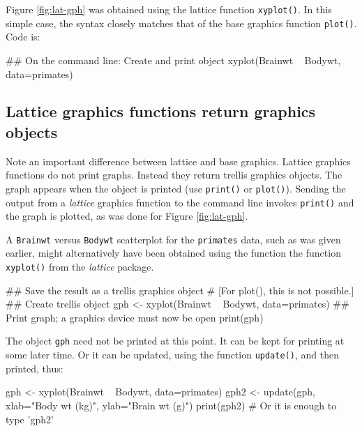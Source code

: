 \documentclass{tufte-book}\usepackage[]{graphicx}\usepackage[]{color}
\newcommand{\txtt}[1]{\texttt{#1}}
\begin{document}
Figure \ref{fig:lat-gph} was obtained using the lattice function
\txtt{xyplot()}. In this simple case, the syntax closely matches
that of the base graphics function \txtt{plot()}. Code is:

\begin{Schunk}
\begin{Sinput}
## On the command line: Create and print object
xyplot(Brainwt ~ Bodywt, data=primates)
\end{Sinput}
\end{Schunk}

\subsection*{Lattice graphics functions return graphics objects}
Note an important difference between lattice and base graphics.
Lattice graphics functions do not print graphs. Instead they return
trellis graphics objects.  The graph appears when the object is
printed (use \txtt{print()} or \txtt{plot()}).  Sending the output
from a {\em lattice} graphics function to the command line invokes
\txtt{print()} and the graph is plotted, as was done for Figure
\ref{fig:lat-gph}.

A \txtt{Brainwt} versus \txtt{Bodywt} scatterplot for the
\txtt{primates} data, such as was given earlier, might alternatively
have been obtained using the function the function \txtt{xyplot()}
from the \textit{lattice} package.

\begin{Schunk}
\begin{Sinput}
## Save the result as a trellis graphics object
# [For plot(), this is not possible.]
## Create trellis object
gph <- xyplot(Brainwt ~ Bodywt, data=primates)
## Print graph; a graphics device must now be open
print(gph)
\end{Sinput}
\end{Schunk}
The object \txtt{gph} need not be printed at this point.  It can be
kept for printing at some later time.  Or it can be updated, using the
function \txtt{update()}, and then printed, thus:
\begin{Schunk}
\begin{Sinput}
gph <- xyplot(Brainwt ~ Bodywt, data=primates)
gph2 <- update(gph, xlab="Body wt (kg)",
               ylab="Brain wt (g)")
print(gph2)  # Or it is enough to type 'gph2'
\end{Sinput}
\end{Schunk}
\end{document}
